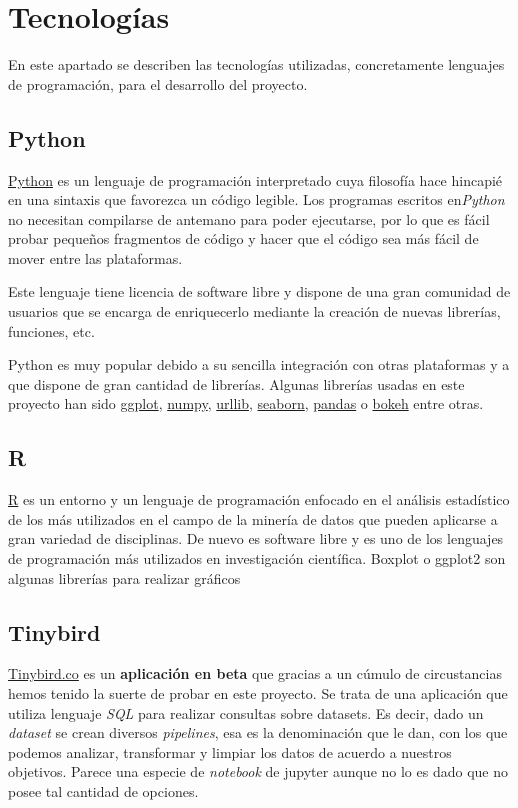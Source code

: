 \section{Tecnologías}\label{tecnologias}
 En este apartado se describen las tecnologías utilizadas, concretamente lenguajes de programación, para el desarrollo del proyecto. 
 
 \subsection{Python}\label{tecnologias_python}
 
 \href{python.org}{Python} es un lenguaje de programación interpretado cuya filosofía hace hincapié en una sintaxis que favorezca un código legible. Los programas escritos en\textit{Python} no necesitan compilarse de antemano para poder ejecutarse, por lo que es fácil probar pequeños fragmentos de código y hacer que el código sea más fácil de mover entre las plataformas.
 
 
Este lenguaje tiene licencia de software libre y dispone de una gran comunidad de usuarios que se encarga de enriquecerlo mediante la creación de nuevas librerías, funciones, etc. 

Python es muy popular debido a su sencilla integración con otras plataformas y a que dispone de gran cantidad de librerías. Algunas librerías usadas en este proyecto han sido \href{https://ggplot2.tidyverse.org/}{ggplot}, \href{https://numpy.org/}{numpy}, \href{https://numpy.org/}{urllib},
\href{https://seaborn.pydata.org/}{seaborn},
 \href{https://pandas.pydata.org/}{pandas} o \href{https://bokeh.org/}{bokeh} entre otras.

  \subsection{R}\label{tecnologias_R}
  \href{r-project.org}{R} es un entorno y un lenguaje de programación enfocado en el análisis estadístico de los más utilizados en el campo de la minería de datos que pueden aplicarse a gran variedad de disciplinas. De nuevo es software libre y es uno de los lenguajes de programación más utilizados en investigación científica. Boxplot o ggplot2 son algunas librerías para realizar gráficos
  
 \subsection{Tinybird}
\href{https://tinybird.co/}{Tinybird.co} es un \textbf{aplicación en beta} que gracias a un cúmulo de circustancias hemos tenido la suerte de probar en este proyecto. Se trata de una aplicación que utiliza lenguaje \textit{SQL} para realizar consultas sobre datasets. Es decir, dado un \textit{dataset} se crean diversos \textit{pipelines}, esa es la denominación que le dan, con los que podemos analizar, transformar y limpiar los datos de acuerdo a nuestros objetivos. Parece una especie de \textit{notebook} de jupyter aunque no lo es dado que no posee tal cantidad de opciones. 

